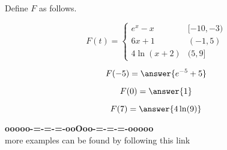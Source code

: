 \documentclass{ximera}
\begin{document}
\begin{example}

Define $F$ as follows.


\[
F(t) = 
\begin{cases}
  e^x - x   &    [-10, -3)     \\
  6x + 1  &    (-1, 5) \\
  4 \ln(x+2)    &    (5, 9]
\end{cases}
\]




\begin{question}

\[
F(-5) = \answer{e^{-5} + 5}
\]


\end{question}




\begin{question}

\[
F(0) = \answer{1}
\]


\end{question}






\begin{question}

\[
F(7) = \answer{4 \ln(9)}
\]


\end{question}




\end{example}
















































\begin{center}
\textbf{\textcolor{green!50!black}{ooooo-=-=-=-ooOoo-=-=-=-ooooo}} \\

more examples can be found by following this link\\ 

\end{center}
\end{document}
